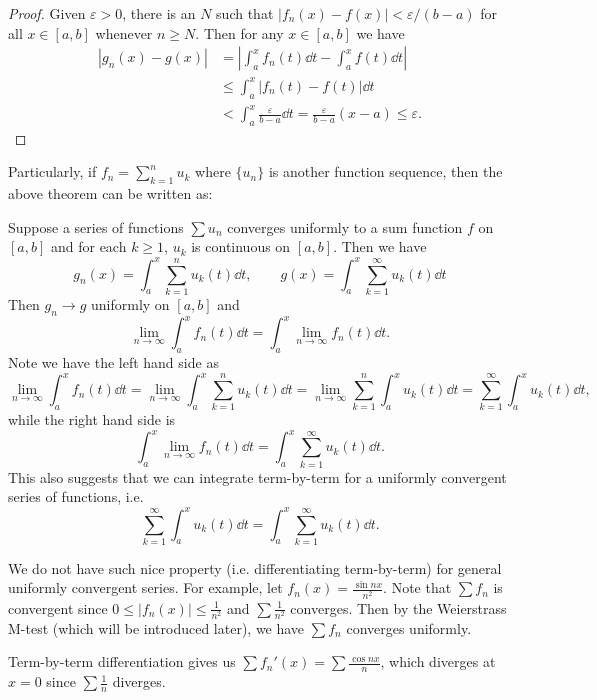 \documentclass[a4paper]{ctexart}
\begin{document}
    \begin{proof}
        Given $\varepsilon >0$, there is an $N$ such that $|f_n(x) - f(x)| < \varepsilon/(b-a)$ for all $x\in [a,b]$ whenever $n\ge N$. Then for any $x\in [a,b]$ we have
        \[\begin{aligned}
            |g_n(x) - g(x)| &= \left| \int_a^x f_n(t) \dd t - \int_a^x f(t) \dd t \right|\\
            &\le \int_a^x |f_n(t) - f(t)| \dd t\\
            &< \int_a^x \frac{\varepsilon}{b-a} \dd t = \frac{\varepsilon}{b-a} (x-a) \le \varepsilon.
        \end{aligned}\]
    \end{proof}
    \begin{mypro}
        Particularly, if $f_n=\displaystyle \sum_{k=1}^n u_k$ where $\{u_n\}$ is another function sequence, then the above theorem can be written as:

        Suppose a series of functions $\sum u_n$ converges uniformly to a sum function $f$ on $[a,b]$ and for each $k\ge 1$, $u_k$ is continuous on $[a,b]$. Then we have
        \[
        g_n(x) = \int_a^x \sum_{k=1}^n u_k(t) \dd t,\qquad g(x) = \int_a^x \sum_{k=1}^\infty u_k(t) \dd t
        \]
        Then $g_n \to g$ uniformly on $[a,b]$ and
        \[
        \lim_{n\to \infty} \int_a^x f_n(t) \dd t = \int_a^x \lim_{n\to \infty} f_n(t) \dd t.
        \]
        Note we have the left hand side as
        \[
        \lim_{n\to \infty} \int_a^x f_n(t) \dd t = \lim_{n\to \infty} \int_a^x \sum_{k=1}^n u_k(t) \dd t = \lim_{n\to \infty} \sum_{k=1}^n \int_a^x u_k(t) \dd t = \sum_{k=1}^\infty \int_a^x u_k(t) \dd t,
        \]
        while the right hand side is
        \[
        \int_a^x \lim_{n\to \infty} f_n(t) \dd t = \int_a^x \sum_{k=1}^\infty u_k(t) \dd t.
        \]
        This also suggests that we can integrate term-by-term for a uniformly convergent series of functions, i.e.
        \[
        \sum_{k=1}^\infty \int_a^x u_k(t) \dd t = \int _a^x\sum_{k=1}^\infty u_k(t) \dd t.
        \]

    \end{mypro}
    \begin{myrmk}
        We do not have such nice property (i.e. differentiating term-by-term) for general uniformly convergent series. For example, let $f_n(x) = \displaystyle \frac{\sin nx}{n^2}$. Note that $\sum f_n$ is convergent since $\displaystyle 0\le |f_n(x)| \le \frac{1}{n^2}$ and $\displaystyle \sum \frac{1}{n^2}$ converges. Then by the Weierstrass M-test (which will be introduced later), we have $\sum f_n$ converges uniformly.

        Term-by-term differentiation gives us $\displaystyle \sum f_n'(x) = \sum \frac{\cos nx}{n}$, which diverges at $x=0$ since $\displaystyle \sum \frac{1}{n}$ diverges.
    \end{myrmk}
\end{document}
